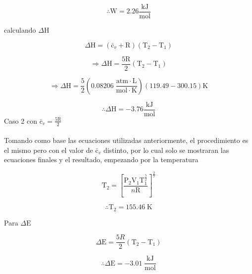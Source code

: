 \documentclass[12pt]{article}
\begin{document}
\begin{displaymath}
	\therefore\mathrm{W}=2.26\frac{\mathrm{kJ}}{\mathrm{mol}}
\end{displaymath}

calculando $\Delta\mathrm{H}$

\begin{displaymath}
	\Delta\mathrm{H}=(\mathrm{\bar{c}}_v+\mathrm{R})(\mathrm{T}_2-\mathrm{T}_1)
\end{displaymath}

\begin{displaymath}
	\Rightarrow\Delta\mathrm{H}=\frac{5\mathrm{R}}{2}(\mathrm{T}_2-\mathrm{T}_1)
\end{displaymath}

\begin{displaymath}
	\Rightarrow\Delta\mathrm{H}=\frac{5}{2}\left( 0.08206\; \frac{\mathrm{atm}\cdot\mathrm{L}}{\mathrm{mol}\cdot\mathrm{K}} \right)\left( 119.49-300.15 \right)\mathrm{K}
\end{displaymath}

\begin{displaymath}
	\therefore\Delta\mathrm{H}=-3.76\frac{\mathrm{kJ}}{\mathrm{mol}}
\end{displaymath}
\newpage
Caso 2 con $\mathrm{\bar{c}}_v=\frac{5\mathrm{R}}{2}$\\
\\
Tomando como base las ecuaciones utilizadas anteriormente, el procedimiento es el mismo pero con el valor de $\mathrm{\bar{c}}_v$ distinto, por lo cual solo se mostraran las ecuaciones finales y el resultado, empezando por la temperatura

\begin{displaymath}
	\mathrm{T}_2=\left[ \frac{\mathrm{P}_2\mathrm{V}_1\mathrm{T}_1^{\frac{5}{2}}}{n\mathrm{R}} \right]^{\frac{2}{7}}
\end{displaymath}

\begin{displaymath}
	\therefore\mathrm{T}_2=155.46\;\mathrm{K}
\end{displaymath}

Para $\Delta\mathrm{E}$

\begin{displaymath}
	\Delta\mathrm{E}=\frac{5R}{2}(\mathrm{T}_2-\mathrm{T}_1)
\end{displaymath}

\begin{displaymath}
	\therefore\Delta\mathrm{E}=-3.01\;\frac{\mathrm{kJ}}{\mathrm{mol}}
\end{displaymath}
\end{document}
